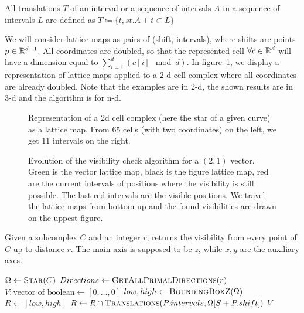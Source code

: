 \begin{definition}
  All translations $T$ of an interval or a sequence of intervals $A$ in a sequence of intervals $L$ are defined as $ T \coloneqq \{ t, st. A+t \subset L\}$
\end{definition}

We will consider lattice maps as pairs of (shift, intervals), where shifts are points $p \in \mathbb{R}^{d-1}$. All coordinates are doubled, so that the represented cell $\forall c \in \mathbb{R}^d$ will have a dimension equal to $\sum_{i=1}^d \left(c[i]\mod d\right)$.
In figure~\ref{fig:lattice-representation}, we display a representation of lattice maps applied to a 2-d cell complex where all coordinates are already doubled. Note that the examples are in 2-d, the shown results are in 3-d and the algorithm is for n-d.

\begin{figure}
  \centering
  
  \caption{\label{fig:lattice-representation} Representation of a
    2d cell complex (here the star of a given curve) as a lattice
    map. From 65 cells (with two coordinates) on the left, we get 11
    intervals on the right.}
\end{figure}

\begin{figure}
  \centering
  
  \caption{Evolution of the visibility check algorithm for a $(2,1)$
    vector. Green is the vector lattice map, black is the figure
    lattice map, red are the current intervals of positions where
    the visibility is still possible. The last red intervals are
    the visible positions. We travel the lattice maps from
    bottom-up and the found visibilities are drawn on the
    uppest figure.}
  \label{fig:visibility-algorithm-evolution}
\end{figure}

\begin{algorithm}
  \caption{Given a subcomplex $C$ and an integer $r$, returns the visibility from every point of $C$ up to distance $r$. The main axis is supposed to be $z$, while $x,y$ are the auxiliary axes.}
  \label{alg:visibility}
  \begin{algorithmic}
    \State $\Omega \gets \Call{Star}{C}$ 
    \State $Directions \gets \Call{GetAllPrimalDirections}{r}$
    \State $V: \text{vector of boolean} \gets [0, \ldots, 0]$ 
    \State $low, high \gets \Call{BoundingBoxZ}{\Omega}$
    \State $R \gets [low, high]$
    \State $R \gets R \cap \Call{Translations}{P.intervals,\Omega[S + P.shift]}$
    \EndFor
    \State {}
    \EndFor
    \EndFor
    \State \Return $V$
    \EndFunction
  \end{algorithmic}
\end{algorithm}

